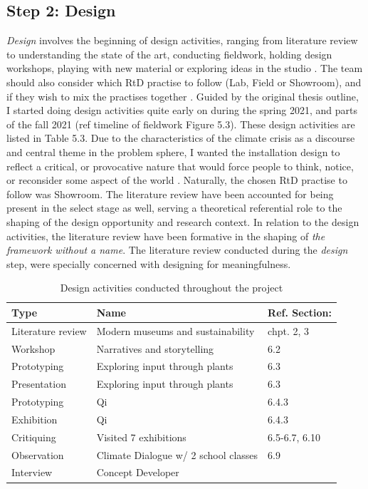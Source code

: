 \subsection{Step 2: Design}
\textit{Design} involves the beginning of design activities, ranging from literature review to understanding the state of the art, conducting fieldwork, holding design workshops, playing with new material or exploring ideas in the studio \autocite[p. 185]{zimmerman_research_2014}. The team should also consider which RtD practise to follow (Lab, Field or Showroom), and if they wish to mix the practises together \autocite[p. 185]{zimmerman_research_2014}. Guided by the original thesis outline, I started doing design activities quite early on during the spring 2021, and parts of the fall 2021 (ref timeline of fieldwork Figure 5.3). These design activities are listed in Table 5.3. Due to the characteristics of the climate crisis as a discourse and central theme in the problem sphere, I wanted the installation design to reflect a critical, or provocative nature that would force people to think, notice, or reconsider some aspect of the world \autocite[p. 173]{zimmerman_research_2014}. Naturally, the chosen RtD practise to follow was Showroom. The literature review have been accounted for being present in the select stage as well, serving a theoretical referential role to the shaping of the design opportunity and research context. In relation to the design activities, the literature review have been formative in the shaping of \emph{the framework without a name}. The literature review conducted during the \emph{design} step, were specially concerned with designing for meaningfulness.

\begin{table}[H]
\centering
\begin{tabular}{| l | l | l |}
\hline
\textbf{Type} & \textbf{Name} & \textbf{Ref. Section:}\\
\hline
Literature review & Modern museums and sustainability & chpt. 2, 3 \\
Workshop & Narratives and storytelling & 6.2 \\
Prototyping & Exploring input through plants & 6.3 \\
Presentation & Exploring input through plants & 6.3 \\
Prototyping & Qi & 6.4.3 \\
Exhibition & Qi & 6.4.3 \\
Critiquing & Visited 7 exhibitions & 6.5-6.7, 6.10\\
Observation & Climate Dialogue w/ 2 school classes & 6.9\\
Interview & Concept Developer & \\
\hline
\end{tabular}
\caption{Design activities conducted throughout the project}
\end{table}

